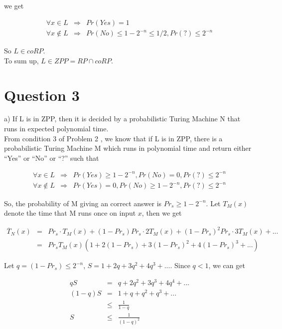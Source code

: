 \documentclass[12pt]{article}
\begin{document}
we get

\begin{eqnarray*}
\forall x \in L &\Rightarrow& Pr(Yes) = 1 \\
\forall x \notin L &\Rightarrow& Pr(No) \le 1 - 2^{-n} \le 1/2,
Pr(?) \le 2^{-n}
\end{eqnarray*}

So $L \in coRP$. \\

To sum up, $L \in ZPP = RP \cap coRP$.

\section*{Question 3}

a) If L is in ZPP, then it is decided by a probabilistic Turing
Machine N that runs in expected polynomial time. \\

From condition 3 of Problem 2 , we know that if L is in ZPP, there is
a probabilistic Turing Machine M which runs in  polynomial time and
return either ``Yes'' or ``No'' or ``?'' such that 

\begin{eqnarray*}
\forall x \in L &\Rightarrow& Pr(Yes) \ge 1 - 2^{-n}, Pr(No) = 0, Pr(?)
\le 2^{-n} \\
\forall x \notin L &\Rightarrow& Pr(Yes) = 0, Pr(No) \ge 1 - 2^{-n},
Pr(?) \le 2^{-n}
\end{eqnarray*}

So, the probability of M giving an correct answer is $Pr_s \ge 1 -
2^{-n}$. Let $T_M(x)$ denote the time that M runs once on input
$x$, then we get

\begin{eqnarray*}
\overline {T}_N(x)
&=& Pr_s \cdot T_M(x) + (1 - Pr_s) Pr_s \cdot 2T_M(x) + (1 - Pr_s)^2
Pr_s \cdot 3T_M(x) + ... \\
&=& Pr_s T_M(x) (1 + 2(1 - Pr_s) + 3(1 - Pr_s)^2 + 4(1 - Pr_s)^3 + ...)
\end{eqnarray*}

Let $q = (1 - Pr_s) \le 2^{-n}$, $S = 1 + 2q + 3q^2 + 4q^3 +
...$. Since $q < 1$, we can get

\begin{eqnarray*}
qS &=& q + 2q^2 + 3q^3 + 4q^4 + ... \\
(1 - q)S &=& 1 + q + q^2 + q^3 + ... \\
         &\le& \frac {1}{1-q} \\
S &\le& \frac {1}{(1 - q)^2}
\end{eqnarray*}
\end{document}
